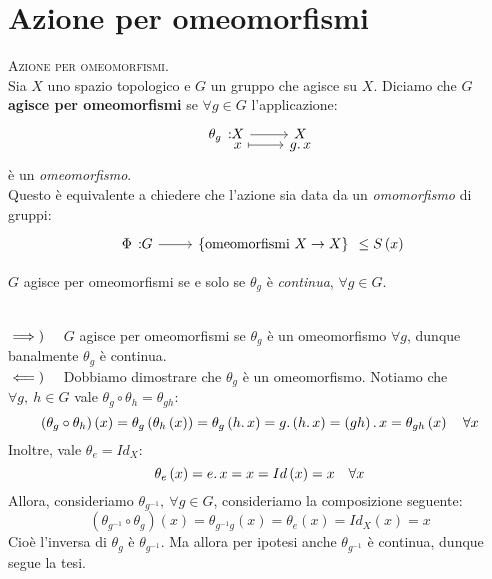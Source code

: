 \section{Azione per omeomorfismi}
\begin{define}\textsc{Azione per omeomorfismi.}\\
Sia $X$ uno spazio topologico e $G$ un gruppo che agisce su $X$. Diciamo che $G$ \textbf{agisce per omeomorfismi} se $\forall g\in G$ l'applicazione:
\begin{equation}
\funztot{\theta_g}{X}{X}{x}{g\ldotp x}
\end{equation}
è un \textit{omeomorfismo}.\\
Questo è equivalente a chiedere che l'azione sia data da un \textit{omomorfismo} di gruppi:
\begin{equation}
\funz{\Phi}{G}{\left\{\text{omeomorfismi } X\rightarrow X\right\}}\leq S\left(x\right)
\end{equation}
\vspace{-6mm}
\end{define}
\begin{exercise}
$G$ agisce per omeomorfismi se e solo se $\theta_g$ è \textit{continua}, $\forall g\in G$.
\end{exercise}
\begin{demonstration}~{}\\
$\implies)\quad$ $G$ agisce per omeomorfismi se $\theta_g$ è un omeomorfismo $\forall g$, dunque banalmente $\theta_g$ è continua.\\
$\impliedby)\quad$ Dobbiamo dimostrare che $\theta_g$ è un omeomorfismo. Notiamo che $\forall g,\ h\in G$ vale $\theta_g\circ \theta_h = \theta_{gh}$:
\begin{equation*}
	\left(\theta_g\circ\theta_h\right)\left(x\right)=\theta_g\left(\theta_h\left(x\right)\right)=\theta_g\left(h\ldotp x\right)=g\ldotp\left(h\ldotp x\right)=\left(gh\right)\ldotp x=\theta_{gh}\left(x\right)\quad \forall x
\end{equation*}
Inoltre, vale $\theta_e=Id_X$:
\begin{equation*}
	\theta_e\left(x\right)=e\ldotp x=x=Id\left(x\right)=x\quad \forall x
\end{equation*}
Allora, consideriamo $\theta_{g^{-1}},\ \forall g\in G$, consideriamo la composizione seguente:
\begin{equation*}
	\left(\theta_{g^{-1}}\circ\theta_g\right)\left(x\right)=\theta_{g^{-1}g}\left(x\right)=\theta_e\left(x\right)=Id_X\left(x\right)=x
\end{equation*}
Cioè l'inversa di $\theta_g$ è $\theta_{g^{-1}}$. Ma allora per ipotesi anche $\theta_{g^{-1}}$ è continua, dunque segue la tesi.
\end{demonstration}
